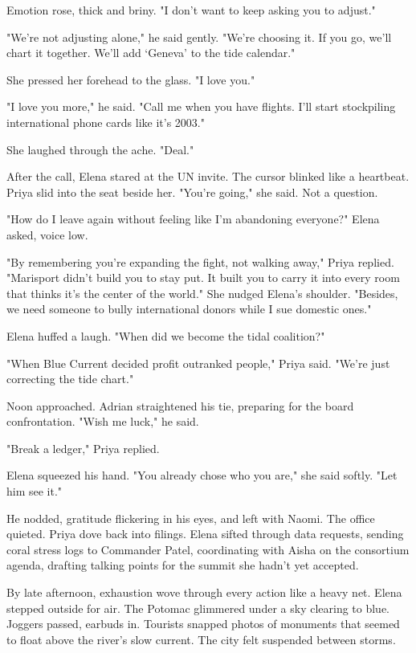 Emotion rose, thick and briny. "I don't want to keep asking you to adjust."

"We're not adjusting alone," he said gently. "We're choosing it. If you go, we'll chart it together. We'll add `Geneva' to the tide calendar."

She pressed her forehead to the glass. "I love you."

"I love you more," he said. "Call me when you have flights. I'll start stockpiling international phone cards like it's 2003."

She laughed through the ache. "Deal."

After the call, Elena stared at the UN invite. The cursor blinked like a heartbeat. Priya slid into the seat beside her. "You're going," she said. Not a question.

"How do I leave again without feeling like I'm abandoning everyone?" Elena asked, voice low.

"By remembering you're expanding the fight, not walking away," Priya replied. "Marisport didn't build you to stay put. It built you to carry it into every room that thinks it's the center of the world." She nudged Elena's shoulder. "Besides, we need someone to bully international donors while I sue domestic ones."

Elena huffed a laugh. "When did we become the tidal coalition?"

"When Blue Current decided profit outranked people," Priya said. "We're just correcting the tide chart."

Noon approached. Adrian straightened his tie, preparing for the board confrontation. "Wish me luck," he said.

"Break a ledger," Priya replied.

Elena squeezed his hand. "You already chose who you are," she said softly. "Let him see it."

He nodded, gratitude flickering in his eyes, and left with Naomi. The office quieted. Priya dove back into filings. Elena sifted through data requests, sending coral stress logs to Commander Patel, coordinating with Aisha on the consortium agenda, drafting talking points for the summit she hadn't yet accepted.

By late afternoon, exhaustion wove through every action like a heavy net. Elena stepped outside for air. The Potomac glimmered under a sky clearing to blue. Joggers passed, earbuds in. Tourists snapped photos of monuments that seemed to float above the river's slow current. The city felt suspended between storms.

